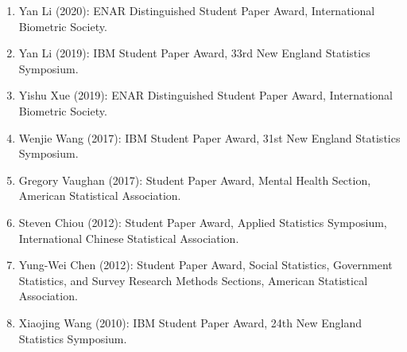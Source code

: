 \documentclass[Statistics]{vita}
\begin{document}
\begin{vita}
\begin{enumerate}
    \item Yan Li (2020): ENAR Distinguished Student Paper Award, International Biometric Society.
    \item Yan Li (2019): IBM Student Paper Award, 33rd New England Statistics Symposium.
    \item Yishu Xue (2019): ENAR Distinguished Student Paper Award, International Biometric Society.
    \item Wenjie Wang (2017): IBM Student Paper Award, 31st New England Statistics Symposium.
    \item Gregory Vaughan (2017): Student Paper Award, Mental Health Section, American Statistical Association.
    \item Steven Chiou (2012): Student Paper Award, Applied Statistics Symposium, International Chinese Statistical Association.
    \item Yung-Wei Chen (2012): Student Paper Award,  Social Statistics, Government Statistics, and Survey Research Methods Sections,  American Statistical Association.
    \item Xiaojing Wang (2010): IBM Student Paper Award, 24th New England Statistics Symposium.
    \end{enumerate}

\end{vita}
\end{document}
